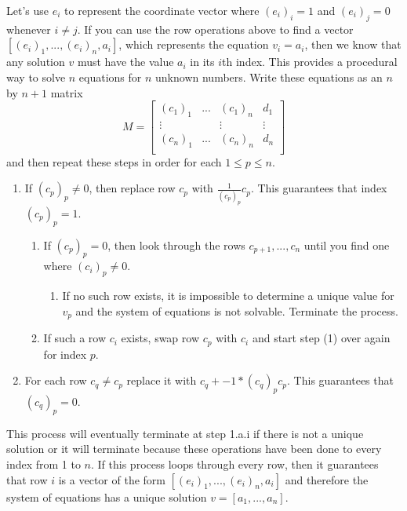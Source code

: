 Let's use $e_i$ to represent the coordinate vector where $(e_i)_i=1$ and $(e_i)_j=0$ whenever $i\neq j$. If you can use the row operations above to find a vector $[(e_i)_1,...,(e_i)_n,a_i]$, which represents the equation $v_i=a_i$, then we know that any solution $v$ must have the value $a_i$ in its $i$th index. This provides a procedural way to solve $n$ equations for $n$ unknown numbers. Write these equations as an $n$ by $n+1$ matrix
$$M=\begin{bmatrix}
	(c_1)_1&...&(c_1)_n&d_1\\
	\vdots&&\vdots&\vdots\\
	(c_n)_1&...&(c_n)_n&d_n\\
\end{bmatrix}$$
and then repeat these steps in order for each $1\leq p \leq n$.
\begin{enumerate}
	\item If $(c_p)_p\neq 0$, then replace row $c_p$ with $\frac{1}{(c_p)_p}c_p$. This guarantees that index $(c_p)_p=1$.
	\begin{enumerate}
		\item If $(c_p)_p=0$, then look through the rows $c_{p+1},...,c_n$ until you find one where $(c_i)_p\neq0$.
		\begin{enumerate}
			\item If no such row exists, it is impossible to determine a unique value for $v_p$ and the system of equations is not solvable. Terminate the process.
		\end{enumerate} 
		\item If such a row $c_i$ exists, swap row $c_p$ with $c_i$ and start step (1) over again for index $p$.
	\end{enumerate}
	\item For each row $c_q\neq c_p$ replace it with $c_q + -1 * (c_q)_pc_p$. This guarantees that $(c_q)_p=0$.
\end{enumerate}
This process will eventually terminate at step 1.a.i if there is not a unique solution or it will terminate because these operations have been done to every index from 1 to $n$. If this process loops through every row, then it guarantees that row $i$ is a vector of the form $[(e_i)_1,...,(e_i)_n,a_i]$ and therefore the system of equations has a unique solution $v=[a_1,...,a_n]$.
 
